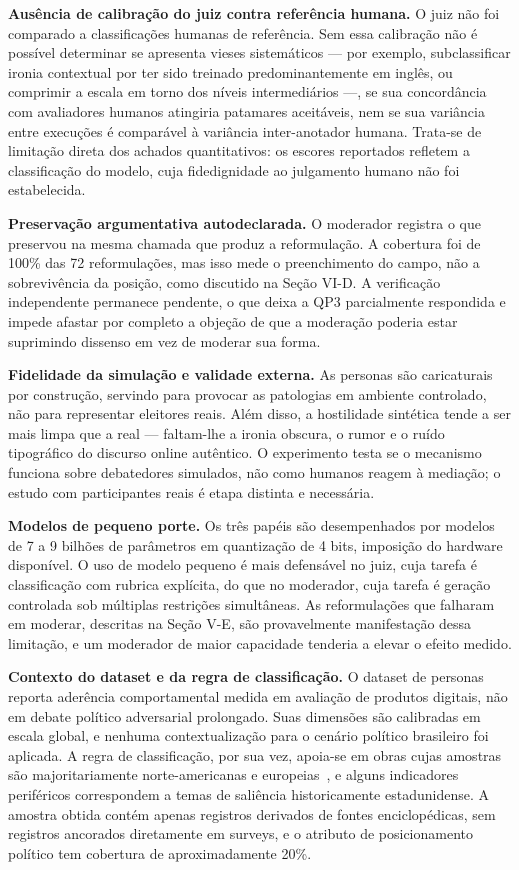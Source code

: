 \documentclass[conference]{IEEEtran} \IEEEoverridecommandlockouts %
\begin{document}
\textbf{Ausência de calibração do juiz contra referência humana.} O juiz não foi
comparado a classificações humanas de referência. Sem essa calibração não é
possível determinar se apresenta vieses sistemáticos — por exemplo,
subclassificar ironia contextual por ter sido treinado predominantemente em
inglês, ou comprimir a escala em torno dos níveis intermediários —, se sua
concordância com avaliadores humanos atingiria patamares aceitáveis, nem se sua
variância entre execuções é comparável à variância inter-anotador humana.
Trata-se de limitação direta dos achados quantitativos: os escores reportados
refletem a classificação do modelo, cuja fidedignidade ao julgamento humano não
foi estabelecida.

\textbf{Preservação argumentativa autodeclarada.} O moderador registra o que
preservou na mesma chamada que produz a reformulação. A cobertura foi de 100\%
das 72 reformulações, mas isso mede o preenchimento do campo, não a
sobrevivência da posição, como discutido na Seção VI-D. A verificação
independente permanece pendente, o que deixa a QP3 parcialmente respondida e
impede afastar por completo a objeção de que a moderação poderia estar
suprimindo dissenso em vez de moderar sua forma.

\textbf{Fidelidade da simulação e validade externa.} As personas são
caricaturais por construção, servindo para provocar as patologias em ambiente
controlado, não para representar eleitores reais. Além disso, a hostilidade
sintética tende a ser mais limpa que a real — faltam-lhe a ironia obscura, o
rumor e o ruído tipográfico do discurso online autêntico. O experimento testa
se o mecanismo funciona sobre debatedores simulados, não como humanos reagem à
mediação; o estudo com participantes reais é etapa distinta e necessária.

\textbf{Modelos de pequeno porte.} Os três papéis são desempenhados por modelos
de 7 a 9 bilhões de parâmetros em quantização de 4 bits, imposição do hardware
disponível. O uso de modelo pequeno é mais defensável no juiz, cuja tarefa é
classificação com rubrica explícita, do que no moderador, cuja tarefa é geração
controlada sob múltiplas restrições simultâneas. As reformulações que falharam
em moderar, descritas na Seção V-E, são provavelmente manifestação dessa
limitação, e um moderador de maior capacidade tenderia a elevar o efeito
medido.

\textbf{Contexto do dataset e da regra de classificação.} O dataset de personas
reporta aderência comportamental medida em avaliação de produtos digitais, não
em debate político adversarial prolongado. Suas dimensões são calibradas em
escala global, e nenhuma contextualização para o cenário político brasileiro
foi aplicada. A regra de classificação, por sua vez, apoia-se em obras cujas
amostras são majoritariamente norte-americanas e
europeias~\cite{jost2003political,piurko2011basic}, e alguns indicadores
periféricos correspondem a temas de saliência historicamente estadunidense. A
amostra obtida contém apenas registros derivados de fontes enciclopédicas, sem
registros ancorados diretamente em surveys, e o atributo de posicionamento
político tem cobertura de aproximadamente 20\%.
\end{document}
